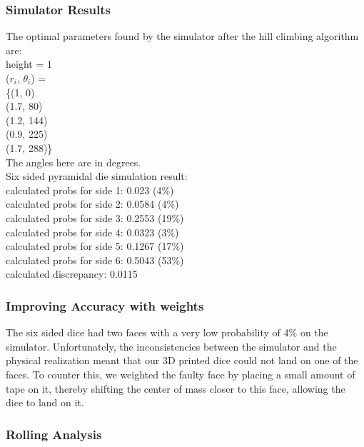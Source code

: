 \subsubsection{Simulator Results}
The optimal parameters found by the simulator after the hill climbing algorithm are:\\
height = 1\\
($r_i$, $\theta_i$) = \\
\{(1, 0)\\
(1.7, 80)\\
(1.2, 144)\\
(0.9, 225)\\
(1.7, 288)\}\\
The angles here are in degrees.\\
Six sided pyramidal die simulation result:\\
calculated probs for side 1: 0.023 (4\%)\\
calculated probs for side 2: 0.0584 (4\%)\\
calculated probs for side 3: 0.2553 (19\%)\\
calculated probs for side 4: 0.0323 (3\%)\\
calculated probs for side 5: 0.1267 (17\%)\\
calculated probs for side 6: 0.5043  (53\%)\\
calculated discrepancy: 0.0115\\

\subsubsection{Improving Accuracy with weights}
The six sided dice had two faces with a very low probability of 4\% on the simulator. Unfortunately, the inconsistencies between the simulator and the physical realization meant that our 3D printed dice could not land on one of the faces. To counter this, we weighted the faulty face by placing a small amount of tape on it, thereby shifting the center of mass closer to this face, allowing the dice to land on it.\\

\subsubsection{Rolling Analysis}


